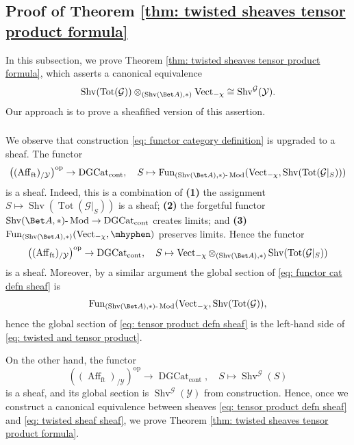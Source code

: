 \documentclass[10pt]{amsart}
\newcommand{\sssec}{\subsubsection}
\theoremstyle{remark}
\newcommand{\on}{\operatorname}
\newcommand{\cG}{\mathcal{G}}
\newcommand{\cY}{\mathcal{Y}}
\newcommand{\DGcat}{\on{DGCat}_{\on{cont}}}
\newcommand{\lMod}{\text{-}\on{Mod}}
\newcommand{\Vect}{\on{Vect}}
\newcommand{\Shv}{\on{Shv}}
\newcommand{\Affft}{\on{Aff}_{\on{ft}}}
\newcommand{\Fun}{\on{Fun}}
\DeclareMathOperator{\op}{op}
\begin{document}
\subsection{Proof of Theorem \ref{thm: twisted sheaves tensor product formula}}\label{ssec: proof of tensor product formula}
In this subsection, we prove Theorem \ref{thm: twisted sheaves tensor product formula}, which asserts a canonical equivalence
\begin{equation}\label{eq: twisted and tensor product}
    \Shv(\on{Tot}(\cG))\otimes_{(\Shv(\Bet A),\ast)}\Vect_{-\chi} \cong \Shv^{\cG}(\cY).
\end{equation}
Our approach is to prove a sheafified version of this assertion.

\sssec{}
We observe that construction \eqref{eq: functor category definition} is upgraded to a sheaf.
The functor 
\begin{equation}\label{eq: functor cat defn sheaf}
\left((\Affft)_{/\cY}\right)^{\op}\rightarrow \DGcat,\quad S\mapsto \Fun_{(\Shv(\Bet A),\ast)\lMod}(\Vect_{-\chi},\Shv(\on{Tot}(\cG|_{S})))
\end{equation}
is a sheaf. Indeed, this is a combination of \textbf{(1)} the assignment $S\mapsto \Shv(\on{Tot}(\cG|_S))$ is a sheaf; \textbf{(2)} the forgetful functor $\Shv(\Bet A,\ast)\lMod\rightarrow \DGcat$ creates limits; and \textbf{(3)} $\Fun_{(\Shv(\Bet A),\ast)}(\Vect_{-\chi},\mhyphen)$ preserves limits. Hence the functor
\begin{equation}\label{eq: tensor product defn sheaf}
\left((\Affft)_{/\cY}\right)^{\op}\rightarrow \DGcat,\quad S\mapsto \Vect_{-\chi}\otimes_{(\Shv(\Bet A),\ast)}\Shv(\on{Tot}(\cG|_{S}))
\end{equation}
is a sheaf. Moreover, by a similar argument the global section of \eqref{eq: functor cat defn sheaf} is
\[\Fun_{(\Shv(\Bet A),\ast)\lMod}(\Vect_{-\chi},\Shv(\on{Tot}(\cG)),\]
hence the global section of \eqref{eq: tensor product defn sheaf} is the left-hand side of \eqref{eq: twisted and tensor product}.
\medskip

On the other hand, the functor
\begin{equation}\label{eq: twisted sheaf sheaf}
    \left((\Affft)_{/\cY}\right)^{\op}\rightarrow \DGcat,\quad S\mapsto \Shv^{\cG}(S)
\end{equation}
is a sheaf, and its global section is $\Shv^{\cG}(\cY)$ from construction. Hence, once we construct a canonical equivalence between sheaves \eqref{eq: tensor product defn sheaf} and \eqref{eq: twisted sheaf sheaf}, we prove Theorem \ref{thm: twisted sheaves tensor product formula}.
\end{document}
